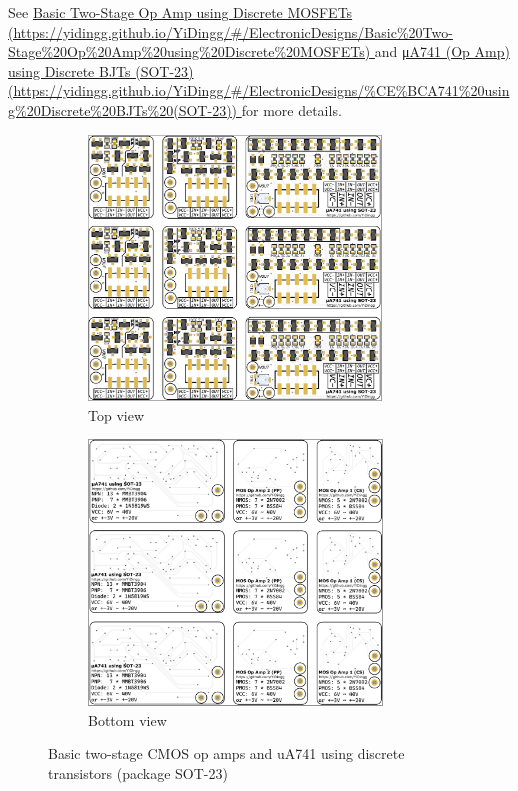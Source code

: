 \documentclass[UTF8]{article}
\begin{document}
See \href{https://yidingg.github.io/YiDingg/\#/ElectronicDesigns/Basic\%20Two-Stage\%20Op\%20Amp\%20using\%20Discrete\%20MOSFETs
}{ %
Basic Two-Stage Op Amp using Discrete MOSFETs {\color{black}\footnotesize (https://yidingg.github.io/YiDingg/\#/ElectronicDesigns/Basic\%20Two-Stage\%20Op\%20Amp\%20using\%20Discrete\%20MOSFETs)}
} 
and 
\href{https://yidingg.github.io/YiDingg/\#/ElectronicDesigns/\%CE\%BCA741\%20using\%20Discrete\%20BJTs\%20(SOT-23)
}{ %
μA741 (Op Amp) using Discrete BJTs (SOT-23) \\ {\color{black}\footnotesize (https://yidingg.github.io/YiDingg/\#/ElectronicDesigns/\%CE\%BCA741\%20using\%20Discrete\%20BJTs\%20(SOT-23))}
}
for more details.

\begin{figure}[H]\centering
\begin{subfigure}[b]{0.5\columnwidth}\centering
    \includegraphics[height=200pt]{LCE-05-精密整流/preview/assets/op amp 1.png}
    \caption{Top view}
\end{subfigure}\hfill
\begin{subfigure}[b]{0.5\columnwidth}\centering
    \includegraphics[height=200pt]{LCE-05-精密整流/preview/assets/op amp 2.png}
    \caption{Bottom view}
\end{subfigure}
\caption{Basic two-stage CMOS op amps and uA741 using discrete transistors (package SOT-23)}
\end{figure}
\end{document}
